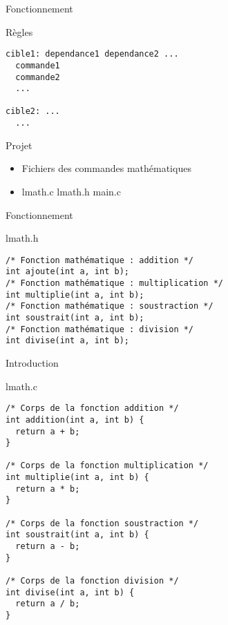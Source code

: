 \def\ftitle{Fonctionnement}
\begin{frame}[containsverbatim]{\ftitle}
\def\blocktitle{Règles}
\begin{block}{\blocktitle}
\begin{verbatim}
cible1: dependance1 dependance2 ...
  commande1
  commande2
  ...
  
cible2: ...
  ...
\end{verbatim}
\end{block}


\def\blocktitle{Projet}
\begin{block}{\blocktitle}
\begin{itemize}
\item Fichiers des commandes mathématiques
\item lmath.c lmath.h main.c
\end{itemize}
\end{block}
\end{frame}


\begin{frame}[containsverbatim]{\ftitle}
\def\blocktitle{lmath.h}
\begin{block}{\blocktitle}
\begin{verbatim}
/* Fonction mathématique : addition */
int ajoute(int a, int b);
/* Fonction mathématique : multiplication */
int multiplie(int a, int b);
/* Fonction mathématique : soustraction */
int soustrait(int a, int b);
/* Fonction mathématique : division */
int divise(int a, int b);
\end{verbatim}
\end{block}
\end{frame}


\def\ftitle{Introduction}
\begin{frame}[containsverbatim]{\ftitle}
\def\blocktitle{lmath.c}
\begin{block}{\blocktitle}
\begin{verbatim}
/* Corps de la fonction addition */
int addition(int a, int b) {
  return a + b;
}

/* Corps de la fonction multiplication */
int multiplie(int a, int b) {
  return a * b;
}

/* Corps de la fonction soustraction */
int soustrait(int a, int b) {
  return a - b;
}

/* Corps de la fonction division */
int divise(int a, int b) {
  return a / b;
}
\end{verbatim}
\end{block}
\end{frame}


